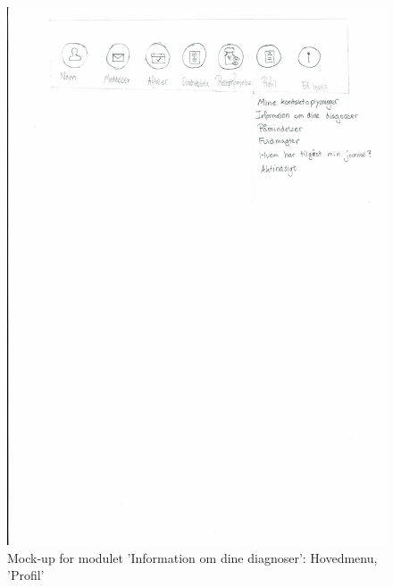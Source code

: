   \begin{figure}[H]
 	\centering
 	\includegraphics[angle=0, height=0.3\textheight]{Materials/Information_Hovedmenu.pdf}
 	\caption{Mock-up for modulet 'Information om dine diagnoser': Hovedmenu, 'Profil'}
 	\label{fig:Mock-Up}
 \end{figure}
